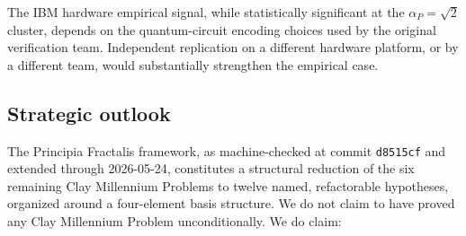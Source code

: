 \documentclass[11pt,a4paper]{article}
\theoremstyle{definition}
\theoremstyle{remark}
\begin{document}
The IBM hardware empirical signal, while statistically significant
at the $\alpha_P = \sqrt{2}$ cluster, depends on the quantum-circuit
encoding choices used by the original verification team. Independent
replication on a different hardware platform, or by a different team,
would substantially strengthen the empirical case.

\subsection{Strategic outlook}

The Principia Fractalis framework, as machine-checked at commit
\texttt{d8515cf} and extended through 2026-05-24, constitutes a
structural reduction of the six remaining Clay Millennium Problems to
twelve named, refactorable hypotheses, organized around a four-element
basis structure. We do not claim to have proved any Clay Millennium
Problem unconditionally. We do claim:
\end{document}
